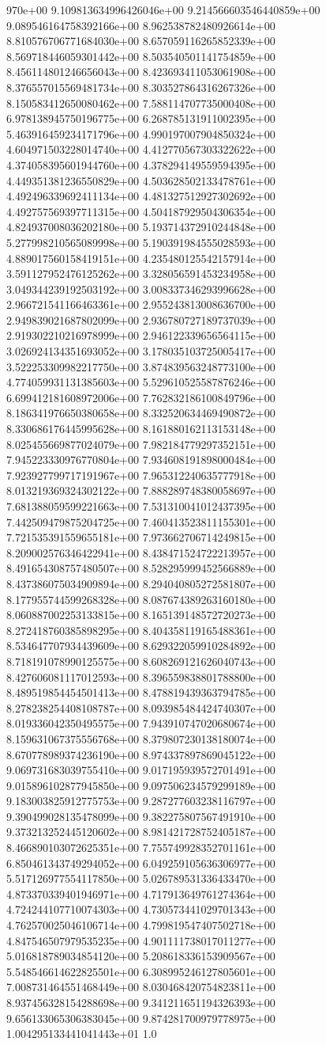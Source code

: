 970e+00	9.109813634996426046e+00	9.214566603546440859e+00	9.089546164758392166e+00	8.962538782480926614e+00	8.810576706771684030e+00	8.657059116265852339e+00	8.569718446059301442e+00	8.503540501141754859e+00	8.456114801246656043e+00	8.423693411053061908e+00	8.376557015569481734e+00	8.303527864316267326e+00	8.150583412650080462e+00	7.588114707735000408e+00	6.978138945750196775e+00	6.268785131911002395e+00	5.463916459234171796e+00	4.990197007904850324e+00	4.604971503228014740e+00	4.412770567303322622e+00	4.374058395601944760e+00	4.378294149559594395e+00	4.449351381236550829e+00	4.503628502133478761e+00	4.492496339692411134e+00	4.481327512927302692e+00	4.492757569397711315e+00	4.504187929504306354e+00	4.824937008036202180e+00	5.193714372910244848e+00	5.277998210565089998e+00	5.190391984555028593e+00	4.889017560158419151e+00	4.235480125542157914e+00	3.591127952476125262e+00	3.328056591453234958e+00	3.049344239192503192e+00	3.008337346293996628e+00	2.966721541166463361e+00	2.955243813008636700e+00	2.949839021687802099e+00	2.936780727189737039e+00	2.919302210216978999e+00	2.946122339656564115e+00	3.026924134351693052e+00	3.178035103725005417e+00	3.522253309982217750e+00	3.874839563248773100e+00	4.774059931131385603e+00	5.529610525587876246e+00	6.699412181608972006e+00	7.762832186100849796e+00	8.186341976650380658e+00	8.332520634469490872e+00	8.330686176445995628e+00	8.161880162113153148e+00	8.025455669877024079e+00	7.982184779297352151e+00	7.945223330976770804e+00	7.934608191898000484e+00	7.923927799717191967e+00	7.965312240635777918e+00	8.013219369324302122e+00	7.888289748380058697e+00	7.681388059599221663e+00	7.531310041012437395e+00	7.442509479875204725e+00	7.460413523811155301e+00	7.721535391559655181e+00	7.973662706714249815e+00	8.209002576346422941e+00	8.438471524722213957e+00	8.491654308757480507e+00	8.528295999452566889e+00	8.437386075034909894e+00	8.294040805272581807e+00	8.177955744599268328e+00	8.087674389263160180e+00	8.060887002253133815e+00	8.165139148572720273e+00	8.272418760385898295e+00	8.404358119165488361e+00	8.534647707934439609e+00	8.629322059910284892e+00	8.718191078990125575e+00	8.608269121626040743e+00	8.427606081117012593e+00	8.396559838801788800e+00	8.489519854454501413e+00	8.478819439363794785e+00	8.278238254408108787e+00	8.093985484424740307e+00	8.019336042350495575e+00	7.943910747020680674e+00	8.159631067375556768e+00	8.379807230138180074e+00	8.670778989374236190e+00	8.974337897869045122e+00	9.069731683039755410e+00	9.017195939572701491e+00	9.015896102877945850e+00	9.097506234579299189e+00	9.183003825912775753e+00	9.287277603238116797e+00	9.390499028135478099e+00	9.382275807567491910e+00	9.373213252445120602e+00	8.981421728752405187e+00	8.466890103072625351e+00	7.755749928352701161e+00	6.850461343749294052e+00	6.049259105636306977e+00	5.517126977554117850e+00	5.026789531336433470e+00	4.873370339401946971e+00	4.717913649761274364e+00	4.724244107710074303e+00	4.730573441029701343e+00	4.762570025046106714e+00	4.799819547407502718e+00	4.847546507979535235e+00	4.901111738017011277e+00	5.016818789034854120e+00	5.208618336153909567e+00	5.548546614622825501e+00	6.308995246127805601e+00	7.008731464551468449e+00	8.030468420754823811e+00	8.937456328154288698e+00	9.341211651194326393e+00	9.656133065306383045e+00	9.874281700979778975e+00	1.004295133441041443e+01	1.0